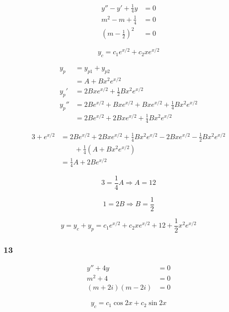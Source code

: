 \documentclass{article}
\begin{document}
\begin{align*}
  y'' - y' + \frac{1}{4} y         & = 0 \\
  m^2 - m + \frac{1}{4}            & = 0 \\
  \left( m - \frac{1}{2} \right)^2 & = 0
\end{align*}

\[y_c = c_1 e^{x / 2} + c_2 x e^{x / 2}\]

\begin{align*}
  y_p   & = y_{p1} + y_{p2}                                                             \\
        & = A + B x^2 e^{x / 2}                                                         \\
  y_p'  & = 2 B x e^{x / 2} + \frac{1}{2} B x^2 e^{x / 2}                               \\
  y_p'' & = 2 B e^{x / 2} + B x e^{x / 2} + B x e^{x / 2} + \frac{1}{4} B x^2 e^{x / 2} \\
        & = 2 B e^{x / 2} + 2Bxe^{x / 2} + \frac{1}{4} Bx^2e^{x / 2}
\end{align*}

\begin{align*}
  3 + e^{x / 2} & = 2 B e^{x / 2} + 2Bxe^{x / 2} + \frac{1}{4} Bx^2e^{x / 2} - 2 B x e^{x / 2} - \frac{1}{2} B x^2 e^{x / 2} \\
                & \qquad + \frac{1}{4} (A + B x^2 e^{x / 2})                                                                 \\
                & = \frac{1}{4} A + 2Be^{x / 2}
\end{align*}

\[3 = \frac{1}{4} A \Rightarrow A = 12\]

\[1 = 2B \Rightarrow B = \frac{1}{2}\]

\[y = y_c + y_p = c_1 e^{x / 2} + c_2 x e^{x / 2} + 12 + \frac{1}{2} x^2 e^{x / 2}\]

\subsubsection{13}

\begin{align*}
  y'' + 4y          & = 0 \\
  m^2 + 4           & = 0 \\
  (m + 2i) (m - 2i) & = 0
\end{align*}

\[y_c = c_1 \cos 2x + c_2 \sin 2x\]
\end{document}

